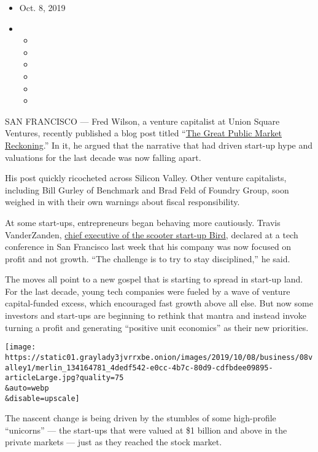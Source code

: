 \begin{itemize}
\item
  Oct. 8, 2019
\item
  \begin{itemize}
  \item
  \item
  \item
  \item
  \item
  \item
  \end{itemize}
\end{itemize}

SAN FRANCISCO --- Fred Wilson, a venture capitalist at Union Square
Ventures, recently published a blog post titled
``\href{https://avc.com/2019/09/the-great-public-market-reckoning/}{The
Great Public Market Reckoning}.'' In it, he argued that the narrative
that had driven start-up hype and valuations for the last decade was now
falling apart.

His post quickly ricocheted across Silicon Valley. Other venture
capitalists, including Bill Gurley of Benchmark and Brad Feld of Foundry
Group, soon weighed in with their own warnings about fiscal
responsibility.

At some start-ups, entrepreneurs began behaving more cautiously. Travis
VanderZanden,
\href{https://www.nytimes3xbfgragh.onion/2018/04/20/technology/electric-scooters-are-causing-havoc-this-man-is-shrugging-it-off.html}{chief
executive of the scooter start-up Bird}, declared at a tech conference
in San Francisco last week that his company was now focused on profit
and not growth. ``The challenge is to try to stay disciplined,'' he
said.

The moves all point to a new gospel that is starting to spread in
start-up land. For the last decade, young tech companies were fueled by
a wave of venture capital-funded excess, which encouraged fast growth
above all else. But now some investors and start-ups are beginning to
rethink that mantra and instead invoke turning a profit and generating
``positive unit economics'' as their new priorities.

\texttt{[image: https://static01.graylady3jvrrxbe.onion/images/2019/10/08/business/08valley1/merlin\_134164781\_4dedf542-e0cc-4b7c-80d9-cdfbdee09895-articleLarge.jpg?quality=75\\\&auto=webp\\\&disable=upscale]}

The nascent change is being driven by the stumbles of some high-profile
``unicorns'' --- the start-ups that were valued at \$1 billion and above
in the private markets --- just as they reached the stock market.

